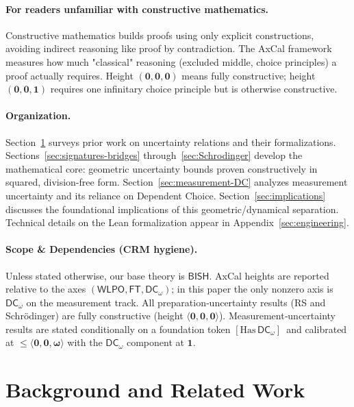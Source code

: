 \documentclass[11pt]{article}
\newcommand{\WLPO}{\mathsf{WLPO}}
\newcommand{\FT}{\mathsf{FT}}
\newcommand{\DCw}{\mathsf{DC}_{\omega}}
\newcommand{\BISH}{\mathsf{BISH}}
\theoremstyle{plain}
\theoremstyle{definition}
\theoremstyle{remark}
\begin{document}
\paragraph{For readers unfamiliar with constructive mathematics.}
Constructive mathematics builds proofs using only explicit constructions, avoiding indirect reasoning like proof by contradiction. The AxCal framework measures how much "classical" reasoning (excluded middle, choice principles) a proof actually requires. Height $(\mathbf{0},\mathbf{0},\mathbf{0})$ means fully constructive; height $(\mathbf{0},\mathbf{0},\mathbf{1})$ requires one infinitary choice principle but is otherwise constructive.

\paragraph{Organization.}
Section~\ref{sec:related} surveys prior work on uncertainty relations and their formalizations.
Sections~\ref{sec:signatures-bridges} through~\ref{sec:Schrodinger} develop the mathematical core: geometric uncertainty bounds proven constructively in squared, division-free form.
Section~\ref{sec:measurement-DC} analyzes measurement uncertainty and its reliance on Dependent Choice.
Section~\ref{sec:implications} discusses the foundational implications of this geometric/dynamical separation.
Technical details on the Lean formalization appear in Appendix~\ref{sec:engineering}.

\paragraph{Scope \& Dependencies (CRM hygiene).}
Unless stated otherwise, our base theory is \(\BISH\). AxCal heights are reported
relative to the axes \((\WLPO,\FT,\DCw)\); in this paper the only nonzero axis is
\(\DCw\) on the measurement track. All preparation‑uncertainty results (RS and
Schrödinger) are fully constructive (height \(\langle\mathbf{0},\mathbf{0},\mathbf{0}\rangle\)).
Measurement‑uncertainty results are stated conditionally on a foundation token
\([{\mathrm{Has}\,\DCw}]\,\) and calibrated at \(\le \langle\mathbf{0},\mathbf{0},\boldsymbol{\omega}\rangle\) with the
\(\DCw\) component at \(\mathbf{1}\).

\section{Background and Related Work}
\label{sec:related}
\end{document}
